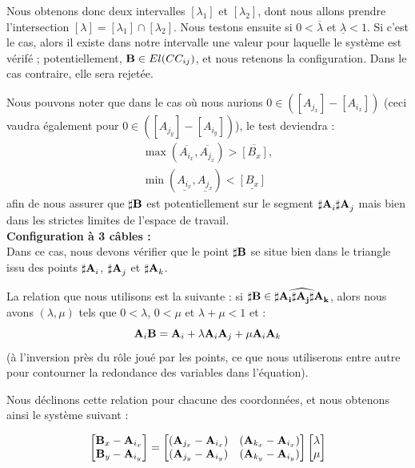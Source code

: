 Nous obtenons donc deux intervalles $[\lambda_1]$ et $[\lambda_2]$, dont nous 
allons prendre l'intersection $[\lambda] = [\lambda_1] \cap [\lambda_2]$. Nous 
testons ensuite si $0 < \overline{\lambda}$ et $\underline{\lambda} < 1$. Si 
c'est le cas, alors il existe dans notre intervalle une valeur pour laquelle le 
syst\`eme est v\'erif\'e ; potentiellement, ${\bf B} \in El(CC_{ij})$, et nous 
retenons la configuration. Dans le cas contraire, elle sera rejet\'ee.

Nous pouvons noter que dans le cas o\`u nous aurions $0 \in ([A_{j_x}] - 
[A_{i_x}])$ (ceci vaudra \'egalement pour $0 \in ([A_{j_y}] - [A_{i_y}])$), le 
test deviendra :
\begin{equation}
\begin{matrix}
\max(\overline{A_{i_x}},\overline{A_{j_x}}) > \overline{[B_x]},\\
\min(\underline{A_{i_x}},\underline{A_{j_x}}) < \underline{[B_x]}
\end{matrix}
\label{chap03:eq17}
\end{equation}
afin de nous assurer que ${\bf \sharp B}$ est potentiellement sur le segment 
${\bf \sharp A}_i{\bf \sharp A}_j$ mais bien dans les strictes limites de 
l'espace de travail.\\

{\bf Configuration \`a 3 c\^ables :}\\

Dans ce cas, nous devons v\'erifier que le point $\bf \sharp B$ se situe bien 
dans le triangle issu des points ${\bf \sharp A}_i$, ${\bf \sharp A}_j$ et 
${\bf \sharp A}_k$.

La relation que nous utilisons est la suivante : si $\bf \sharp B \in 
\widehat{{\bf \sharp A}_i{\bf \sharp A}_j{\bf \sharp A}_k}$, alors nous avons 
$(\lambda, \mu)$ tels que $0 < \lambda$, $0 < \mu$ et $\lambda + \mu < 1$ et :
\begin{equation}
{\bf A}_i {\bf B} = {\bf A}_i + \lambda {\bf A}_i{\bf A}_j + \mu {\bf A}_i{\bf 
A}_k  
\label{chap03:eq17}
\end{equation}
(\`a l'inversion pr\`es du r\^ole jou\'e par les points, ce que nous 
utiliserons entre autre pour contourner la redondance des variables dans 
l'\'equation).

Nous d\'eclinons cette relation pour chacune des coordonn\'ees, et nous 
obtenons ainsi le syst\`eme suivant :

\begin{equation}
\begin{bmatrix}
{\bf B}_{x} - {\bf A}_{i_x} \\
{\bf B}_{y} - {\bf A}_{i_y}
\end{bmatrix} =
\begin{bmatrix}
({\bf A}_{j_x} - {\bf A}_{i_x}) & ({\bf A}_{k_x} - {\bf A}_{i_x}) \\
({\bf A}_{j_y} - {\bf A}_{i_y}) & ({\bf A}_{k_y} - {\bf A}_{i_y})
\end{bmatrix}
\begin{bmatrix}
\lambda \\
\mu
\end{bmatrix}
\label{chap03:eq18}
\end{equation}

